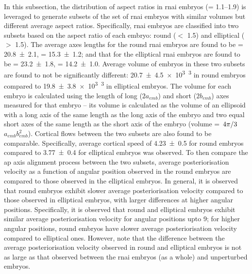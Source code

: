 In this subsection, the distribution of aspect ratios in  \ac{rnai} embryos (\aspectRatio = \numrange{1.1}{1.9}) is leveraged to generate subsets of the set of  \ac{rnai} embryos with similar volumes but different average aspect ratios. Specifically,  \ac{rnai} embryos are classified into two subsets based on the aspect ratio of each embryo: round (\aspectRatio $<$ \num{1.5}) and elliptical (\aspectRatio $>$ \num{1.5}). The average axes lengths for the round  \ac{rnai} embryos are found to be \longAxisLength = \SI{20.8 +- 2.1}{\unitLength}, \shortAxisLength = \SI{15.3 +- 1.2}{\unitLength}; and that for the elliptical  \ac{rnai} embryos are found to be \longAxisLength = \SI{23.2 +- 1.8}{\unitLength}, \shortAxisLength = \SI{14.2 +- 1.0}{\unitLength}. Average volume of embryos in these two subsets are found to not be significantly different: \SI{20.7 +- 4.5 e3}{\unitLength\cubed} in round embryos compared to \SI{19.8 +- 3.8 e3}{\unitLength\cubed} in elliptical embryos. The volume for each embryo is calculated using the length of long ($2a_{emb}$) and short ($2b_{emb}$) axes measured for that embryo -- its volume is calculated as the volume of an ellipsoid with a long axis of the same length as the long axis of the embryo and two equal short axes of the same length as the short axis of the embryo (volume = $\flatfrac{4\pi}{3}$ $a_{emb}b_{emb}^2$). Cortical flows between the two subsets are also found to be comparable. Specifically, average cortical speed of \SI{4.23 +- 0.5}{\unitCrtxVel} for round embryos compared to \SI{3.77 +- 0.4}{\unitCrtxVel} for elliptical embryos was observed. To then compare the \ac{ap} axis alignment process between the two subsets, average posteriorisation velocity as a function of angular position observed in the round embryos are compared to those observed in the elliptical embryos. In general, it is observed that round embryos exhibit slower average posteriorisation velocity compared to those observed in elliptical embryos, with larger differences at higher angular positions. Specifically, it is observed that round and elliptical embryos exhibit similar average posteriorisation velocity for angular positions upto \SI{9}{\unitAngle}; for higher angular positions, round embryos have slower average posteriorisation velocity compared to elliptical ones. However, note that the difference between the average posteriorisation velocity observed in round and elliptical embryos is not as large as that observed between the  \ac{rnai} embryos (as a whole) and unperturbed embryos.

